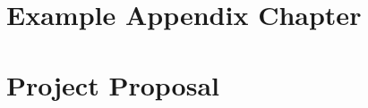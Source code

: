 \documentclass[12pt,a4paper,twoside,openright]{report}
\begin{document}


\appendix

\chapter{Example Appendix Chapter}

\chapter{Project Proposal}


\end{document}
